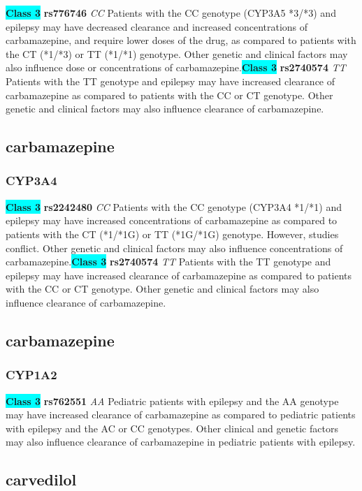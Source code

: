 \documentclass{book}
\begin{document}
\begin{center}
\textbf{\colorbox{cyan} {Class 3}} \textbf{ rs776746 } \textit{ CC }
Patients with the CC genotype (CYP3A5 *3/*3) and epilepsy may have decreased clearance and increased concentrations of carbamazepine, and require lower doses of the drug, as compared to patients with the CT (*1/*3) or TT (*1/*1) genotype. Other genetic and clinical factors may also influence dose or concentrations of carbamazepine.\textbf{\colorbox{cyan} {Class 3}} \textbf{ rs2740574 } \textit{ TT }
Patients with the TT genotype and epilepsy may have increased clearance of carbamazepine as compared to patients with the CC or CT genotype. Other genetic and clinical factors may also influence clearance of carbamazepine.


\end{center}\subsection{ carbamazepine }


\subsubsection{ CYP3A4 }

\begin{center}
\textbf{\colorbox{cyan} {Class 3}} \textbf{ rs2242480 } \textit{ CC }
Patients with the CC genotype (CYP3A4 *1/*1) and epilepsy may have increased concentrations of carbamazepine as compared to patients with the CT (*1/*1G) or TT (*1G/*1G) genotype. However, studies conflict. Other genetic and clinical factors may also influence concentrations of carbamazepine.\textbf{\colorbox{cyan} {Class 3}} \textbf{ rs2740574 } \textit{ TT }
Patients with the TT genotype and epilepsy may have increased clearance of carbamazepine as compared to patients with the CC or CT genotype. Other genetic and clinical factors may also influence clearance of carbamazepine.


\end{center}\subsection{ carbamazepine }


\subsubsection{ CYP1A2 }

\begin{center}
\textbf{\colorbox{cyan} {Class 3}} \textbf{ rs762551 } \textit{ AA }
Pediatric patients with epilepsy and the AA genotype may have increased clearance of carbamazepine as compared to pediatric patients with epilepsy and the AC or CC genotypes. Other clinical and genetic factors may also influence clearance of carbamazepine in pediatric patients with epilepsy.


\end{center}\subsection{ carvedilol }
\end{document}
